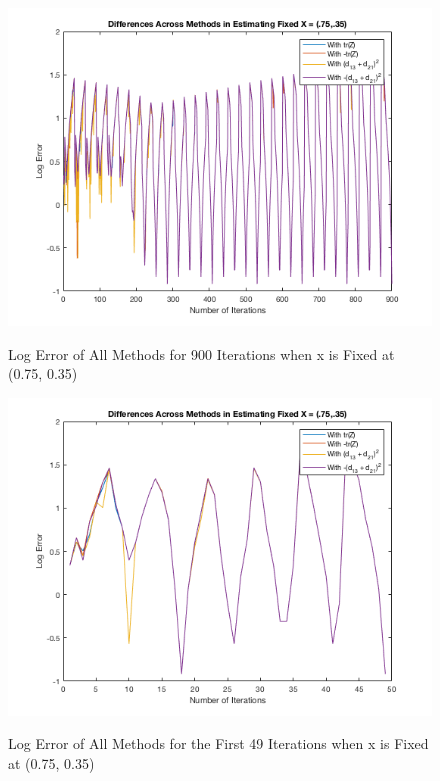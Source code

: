\documentclass[answers]{exam}
\begin{document}
    
    \begin{figure}[H]
     \centering
        \caption{Log Error of All Methods for 900 Iterations when x is Fixed at (0.75, 0.35)}
    \includegraphics[scale=.65]{Problem8harmvf.png}
    \label{le900v}
    \end{figure}
    
    
    \begin{figure}[H]
    \centering
    
        \caption{Log Error of All Methods for the First 49 Iterations when x is Fixed at (0.75, 0.35)}
    \includegraphics[scale=.65]{Problem8priov.png}
    \label{le49v}
    \end{figure}
    
\end{document}
